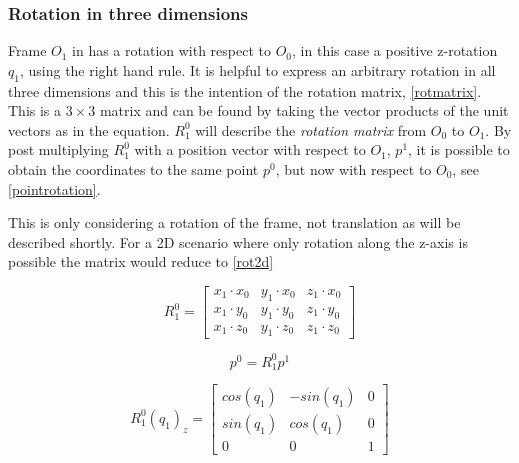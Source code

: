 \subsubsection{Rotation in three dimensions}

Frame $O_1$ in  has a rotation with respect to $O_0$, in this case a positive z-rotation $q_1$, using the right hand rule. It is helpful to express an arbitrary rotation in all three dimensions and this is the intention of the rotation matrix, \eqref{rotmatrix}. This is a $3\times3$ matrix and can be found by taking the vector products of the unit vectors as in the equation. $R_1^0$ will describe the \textit{rotation matrix} from $O_0$ to $O_1$. By post multiplying $R_1^0$ with a position vector with respect to $O_1$, $p^1$, it is possible to obtain the coordinates to the same point $p^0$, but now with respect to $O_0$, see \eqref{pointrotation}.

This is only considering a rotation of the frame, not translation as will be described shortly. For a 2D scenario where only rotation along the z-axis is possible the matrix would reduce to \eqref{rot2d}

\begin{equation}\label{rotmatrix}
R^0_1=\begin{bmatrix}
x_1\cdot x_0 & y_1\cdot x_0 & z_1\cdot x_0\\ 
x_1\cdot y_0 & y_1\cdot y_0 & z_1\cdot y_0\\ 
x_1\cdot z_0 & y_1\cdot z_0 & z_1\cdot z_0
\end{bmatrix}
\end{equation}

\begin{equation}\label{pointrotation}
p^0 = R^0_1p^1
\end{equation}

\begin{equation}\label{rot2d}
R^0_1(q_1)_z=\begin{bmatrix}
cos\left ( q_1 \right ) & -sin\left ( q_1 \right ) & 0\\ 
sin\left ( q_1 \right ) & cos\left ( q_1 \right ) & 0\\ 
0 & 0 & 1
\end{bmatrix}
\end{equation}


